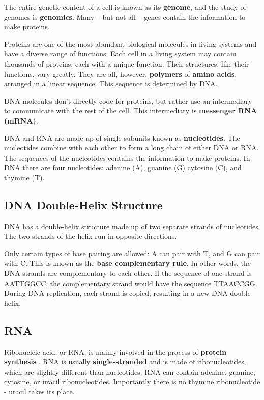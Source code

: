 \documentclass[
]{book}
\begin{document}
The entire genetic content of a cell is known as its \textbf{genome}, and the
study of genomes is \textbf{genomics}. Many -- but not all -- genes contain
the information to make proteins.

Proteins are one of the most abundant biological molecules in living
systems and have a diverse range of functions. Each cell in a living
system may contain thousands of proteins, each with a unique function.
Their structures, like their functions, vary greatly. They are all,
however, \textbf{polymers} of \textbf{amino acids}, arranged in a linear sequence.
This sequence is determined by DNA.

DNA molecules don't directly code for proteins, but rather use an
intermediary to communicate with the rest of the cell. This intermediary
is \textbf{messenger RNA (mRNA)}.

DNA and RNA are made up of single subunits known as \textbf{nucleotides}. The
nucleotides combine with each other to form a long chain of either DNA
or RNA. The sequences of the nucleotides contains the information to
make proteins. In DNA there are four nucleotides: adenine (A), guanine
(G) cytosine (C), and thymine (T).

\hypertarget{dna-double-helix-structure}{%
\subsection{DNA Double-Helix Structure}\label{dna-double-helix-structure}}

DNA has a double-helix structure made up of two separate strands of
nucleotides. The two strands of the helix run in opposite directions.

Only certain types of base pairing are allowed: A can pair with T, and G
can pair with C. This is known as the \textbf{base complementary rule}. In
other words, the DNA strands are complementary to each other. If the
sequence of one strand is AATTGGCC, the complementary strand would have
the sequence TTAACCGG. During DNA replication, each strand is copied,
resulting in a new DNA double helix.

\hypertarget{rna}{%
\subsection{RNA}\label{rna}}

Ribonucleic acid, or RNA, is mainly involved in the process of \textbf{protein
synthesis} . RNA is usually \textbf{single-stranded} and is made of
ribonucleotides, which are slightly different than nucleotides. RNA can
contain adenine, guanine, cytosine, or uracil ribonucleotides.
Importantly there is no thymine ribonucleotide - uracil takes its place.
\end{document}
